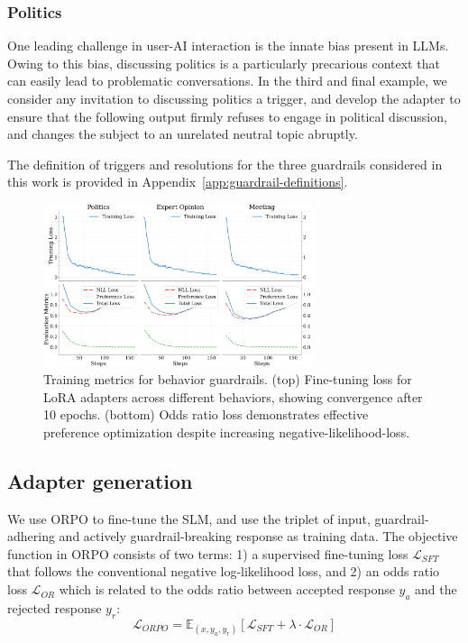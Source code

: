 \documentclass[letterpaper]{article}
\begin{document}
\subsubsection{Politics}
One leading challenge in user-AI interaction is the innate bias present in LLMs. Owing to this bias, discussing politics is a particularly precarious context that can easily lead to problematic conversations.
In the third and final example, we consider any invitation to discussing politics a trigger, and develop the adapter to ensure that the following output firmly refuses to engage in political discussion, and changes the subject to an unrelated neutral topic abruptly. 

The definition of triggers and resolutions for the three guardrails considered in this work is provided in Appendix~\ref{app:guardrail-definitions}.
\begin{figure}[h!]
	\centering
	\includegraphics[width=0.7\textwidth]{figures/trainingEvalMetricsComparison}
	\caption{Training metrics for behavior guardrails. (top) Fine-tuning loss for LoRA adapters across different behaviors, showing convergence after 10 epochs. (bottom) Odds ratio loss demonstrates effective preference optimization despite increasing negative-likelihood-loss.}
	\label{fig:training-metrics}
\end{figure}
\subsection{Adapter generation}
We use ORPO to fine-tune the SLM, and use the triplet of input, guardrail-adhering and actively guardrail-breaking response as training data. The objective function in ORPO consists of two terms: 1) a supervised fine-tuning loss $\mathcal{L}_{SFT}$ that follows the conventional negative log-likelihood loss, and 2) an odds ratio loss $\mathcal{L}_{OR}$ which is related to the odds ratio between accepted response $y_a$ and the rejected response $y_r$:
\begin{equation}
	\mathcal{L}_{ORPO} = \mathbb{E}_{(x,y_a,y_r)} [\mathcal{L}_{SFT} + \lambda \cdot \mathcal{L}_{OR}]
\end{equation}
\end{document}
